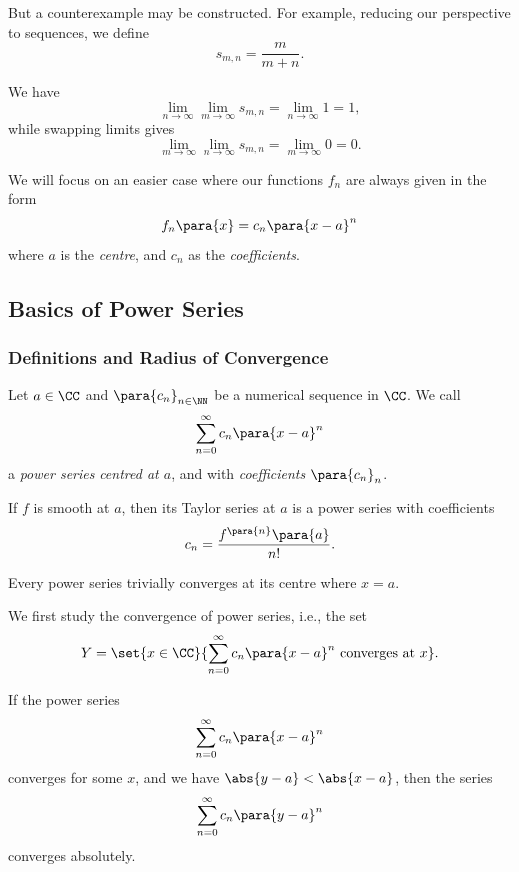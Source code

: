 But a counterexample may be constructed. For example, reducing our perspective to sequences, we define
\[
    s_{m, n} = \frac{m}{m + n}.
\]

We have
\[
    \lim_{n \to \infty} \lim_{m \to \infty} s_{m, n} = \lim_{n \to \infty} 1 = 1,
\]
while swapping limits gives
\[
    \lim_{m \to \infty} \lim_{n \to \infty} s_{m, n} = \lim_{m \to \infty} 0 = 0.
\]

We will focus on an easier case where our functions \(f_n\) are always given in the form
\[
    f_n \para{x} = c_n \para{x - a}^n
\]
where \(a\) is the \emph{centre}, and \(c_n\) as the \emph{coefficients}.

\subsection{Basics of Power Series}

\subsubsection{Definitions and Radius of Convergence}

\begin{definition}
    \label{def:power-series}%
    Let \(a \in \CC\) and \(\para{c_n}_{n \in \NN}\) be a numerical sequence in \(\CC\). We call
    \[
        \sum_{n = 0}^{\infty} c_n \para{x - a}^n
    \]
    a \emph{power series} \emph{centred at \(a\)}, and with \emph{coefficients} \(\para{c_n}_n\).
\end{definition}

\begin{example}
    \label{ex:taylor-series}%
    If \(f\) is smooth at \(a\), then its Taylor series at \(a\) is a power series with coefficients
    \[
        c_n = \frac{f^{\para{n}} \para{a}}{n!}.
    \]
\end{example}

Every power series trivially converges at its centre where \(x = a\).

We first study the convergence of power series, i.e., the set
\[
    Y = \set{x \in \CC}{\sum_{n = 0}^{\infty} c_n \para{x - a}^{n} \text{ converges at }x}.
\]

\begin{lemma}
    \label{lem:convergence-one-point-implies-convergence-smaller-radius}%
    If the power series
    \[
        \sum_{n = 0}^{\infty} c_n \para{x - a}^{n}
    \]
    converges for some \(x\), and we have \(\abs{y - a} < \abs{x - a}\), then the series
    \[
        \sum_{n = 0}^{\infty} c_n \para{y - a}^{n}
    \]
    converges absolutely.
\end{lemma}

